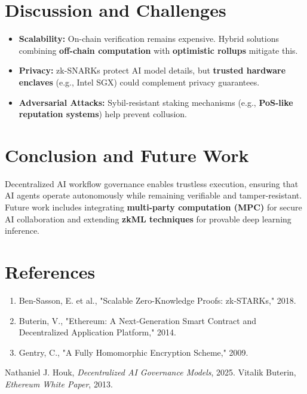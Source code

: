 \documentclass{article}
\begin{document}
\section{Discussion and Challenges}
\begin{itemize}
    \item \textbf{Scalability:} On-chain verification remains expensive. Hybrid solutions combining \textbf{off-chain computation} with \textbf{optimistic rollups} mitigate this.
    \item \textbf{Privacy:} zk-SNARKs protect AI model details, but \textbf{trusted hardware enclaves} (e.g., Intel SGX) could complement privacy guarantees.
    \item \textbf{Adversarial Attacks:} Sybil-resistant staking mechanisms (e.g., \textbf{PoS-like reputation systems}) help prevent collusion.
\end{itemize}

\section{Conclusion and Future Work}
Decentralized AI workflow governance enables trustless execution, ensuring that AI agents operate autonomously while remaining verifiable and tamper-resistant. Future work includes integrating \textbf{multi-party computation (MPC)} for secure AI collaboration and extending \textbf{zkML techniques} for provable deep learning inference.

\section{References}
\begin{enumerate}
    \item Ben-Sasson, E. et al., "Scalable Zero-Knowledge Proofs: zk-STARKs," 2018.
    \item Buterin, V., "Ethereum: A Next-Generation Smart Contract and Decentralized Application Platform," 2014.
    \item Gentry, C., "A Fully Homomorphic Encryption Scheme," 2009.
\end{enumerate}

\begin{thebibliography}{9}
 Nathaniel J. Houk, \textit{Decentralized AI Governance Models}, 2025.
 Vitalik Buterin, \textit{Ethereum White Paper}, 2013.
\end{thebibliography}
\end{document}
